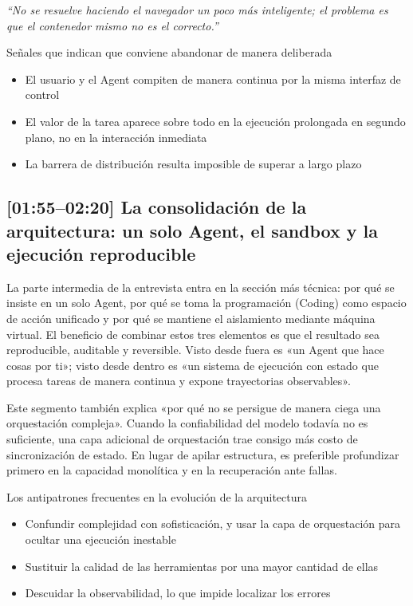 \documentclass[a4paper]{article}
\begin{document}
\textit{``No se resuelve haciendo el navegador un poco más inteligente; el problema es que el contenedor mismo no es el correcto.''}

\begin{knowledgebox}{Señales que indican que conviene abandonar de manera deliberada}
\begin{itemize}
    \item El usuario y el Agent compiten de manera continua por la misma interfaz de control
    \item El valor de la tarea aparece sobre todo en la ejecución prolongada en segundo plano, no en la interacción inmediata
    \item La barrera de distribución resulta imposible de superar a largo plazo
\end{itemize}
\end{knowledgebox}

\subsection{[01:55--02:20] La consolidación de la arquitectura: un solo Agent, el sandbox y la ejecución reproducible}

La parte intermedia de la entrevista entra en la sección más técnica: por qué se insiste en un solo Agent, por qué se toma la programación (Coding) como espacio de acción unificado y por qué se mantiene el aislamiento mediante máquina virtual. El beneficio de combinar estos tres elementos es que el resultado sea reproducible, auditable y reversible. Visto desde fuera es «un Agent que hace cosas por ti»; visto desde dentro es «un sistema de ejecución con estado que procesa tareas de manera continua y expone trayectorias observables».

Este segmento también explica «por qué no se persigue de manera ciega una orquestación compleja». Cuando la confiabilidad del modelo todavía no es suficiente, una capa adicional de orquestación trae consigo más costo de sincronización de estado. En lugar de apilar estructura, es preferible profundizar primero en la capacidad monolítica y en la recuperación ante fallas.

\begin{warningbox}{Los antipatrones frecuentes en la evolución de la arquitectura}
\begin{itemize}
    \item Confundir complejidad con sofisticación, y usar la capa de orquestación para ocultar una ejecución inestable
    \item Sustituir la calidad de las herramientas por una mayor cantidad de ellas
    \item Descuidar la observabilidad, lo que impide localizar los errores
\end{itemize}
\end{warningbox}
\end{document}
